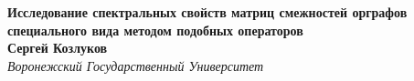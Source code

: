 \documentclass[12pt]{article}
\begin{document}
 

\begin{center}
    \textbf{Исследование спектральных свойств матриц
смежностей орграфов специального вида
методом подобных операторов}\\[3mm]
    \textbf{Сергей Козлуков}\\[2mm]
    \emph{Воронежский Государственный Университет}\\[2mm]


\end{center}


\end{document}
